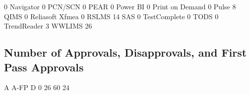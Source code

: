\documentclass{article}
\begin{document}
\begin{Schunk}
\begin{Soutput}
                                       0 
                               Navigator 
                                       0 
                                 PCN/SCN 
                                       0 
                                    PEAR 
                                       0 
                                Power BI 
                                       0 
                         Print on Demand 
                                       0 
                                   Pulse 
                                       8 
                                    QIMS 
                                       0 
                         Reliasoft Xfmea 
                                       0 
                                   RSLMS 
                                      14 
                                     SAS 
                                       0 
                            TestComplete 
                                       0 
                                    TODS 
                                       0 
                             TrendReader 
                                       3 
                                  WWLIMS 
                                      26 
\end{Soutput}
\end{Schunk}

\subsection{Number of Approvals, Disapprovals, and First Pass Approvals}

\begin{Schunk}
\begin{Soutput}
        A A-FP    D 
   0   26   60   24 
\end{Soutput}
\end{Schunk}
\end{document}
